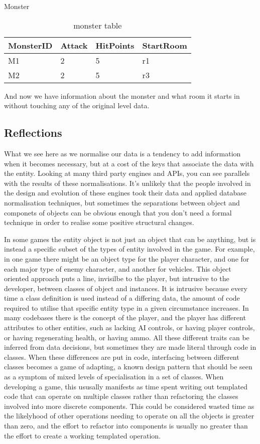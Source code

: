 \begin{table}[h]\footnotesize
Monster \\
\begin{tabular}{llll}
\bf{MonsterID}&Attack&HitPoints&StartRoom \\
\hline
M1&2&5&r1 \\
M2&2&5&r3 \\
\end{tabular}
\caption{monster table}
\end{table}

And now we have information about the monster and what room it starts in
without touching any of the original level data.

\subsection{Reflections}

What we see here as we normalise our data is a tendency to add information when
it becomes necessary, but at a cost of the keys that associate the data with
the entity. Looking at many third party engines and APIs, you can see parallels
with the results of these normalisations.  It's unlikely that the people
involved in the design and evolution of these engines took their data and
applied database normalisation techniques, but sometimes the separations
between object and componets of objects can be obvious enough that you don't
need a formal technique in order to realise some positive structural changes.

In some games the entity object is not just an object that can be anything, but
is instead a specific subset of the types of entity involved in the game. For
example, in one game there might be an object type for the player character,
and one for each major type of enemy character, and another for vehicles. This
object oriented approach puts a line, invisilbe to the player, but intrusive to
the developer, between classes of object and instances. It is intrusive because
every time a class definition is used instead of a differing data, the amount
of code required to utilise that specific entity type in a given circumstance
increases. In many codebases there is the concept of the player, and the player
has different attributes to other entities, such as lacking AI controls, or
having player controls, or having regenerating health, or having ammo. All
these different traits can be inferred from data decisions, but sometimes they
are made literal through code in classes. When these differences are put in
code, interfacing between different classes becomes a game of adapting, a known
design pattern that should be seen as a symptom of mixed levels of
specialisation in a set of classes. When developing a game, this ususally
manifests as time spent writing out templated code that can operate on multiple
classes rather than refactoring the classes involved into more discrete
components. This could be considered wasted time as the likelyhood of other
operations needing to operate on all the objects is greater than zero, and the
effort to refactor into components is usually no greater than the effort to
create a working templated operation.

